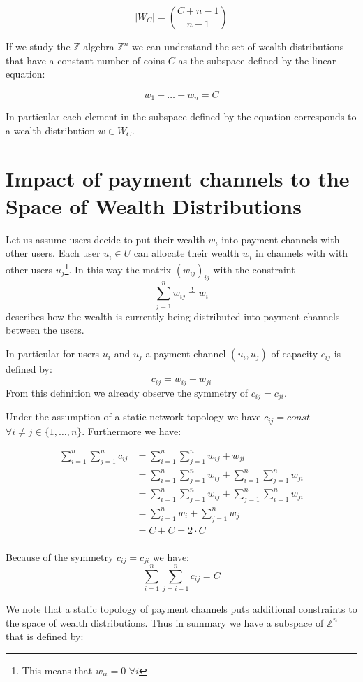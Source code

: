 \documentclass[10pt,twocolumn]{article}
\begin{document}
$$|W_C| = {{C + n - 1}\choose {n - 1}}$$ 

If we study the $\mathbb{Z}$-algebra $\mathbb{Z}^n$ we can understand the set of wealth distributions that have a constant number of coins $C$ as the subspace defined by the linear equation:

$$w_1 + \dots + w_n = C$$

In particular each element in the subspace defined by the equation corresponds to a wealth distribution $w \in W_C$.

\section{Impact of payment channels to the Space of Wealth Distributions}
Let us assume users decide to put their wealth $w_i$ into payment channels with other users.
Each user $u_i\in U$ can allocate their wealth $w_i$ in channels with with other users $u_j$\footnote{This means that $w_{ii}=0$ $\forall i$}.
In this way the matrix $(w_{ij})_{ij}$ with the constraint
$$\sum_{j=1}^nw_{ij}\stackrel{!}{=}w_i$$
describes how the wealth is currently being distributed into payment channels between the users.

In particular for users $u_i$ and $u_j$ a payment channel $(u_i,u_j)$ of capacity $c_{ij}$ is defined by:
$$c_{ij} = w_{ij} + w_{ji}$$
From this definition we already observe the symmetry of $c_{ij} = c_{ji}$.

Under the assumption of a static network topology we have $c_{ij} = const$ $\forall i\neq j \in \{1,\dots,n\}$.
Furthermore we have:

\begin{align*}
\sum_{i=1}^n\sum_{j=1}^nc_{ij} & = \sum_{i=1}^n\sum_{j=1}^nw_{ij} + w_{ji} \\
& = \sum_{i=1}^n\sum_{j=1}^nw_{ij} + \sum_{i=1}^n\sum_{j=1}^n w_{ji} \\
& = \sum_{i=1}^n\sum_{j=1}^nw_{ij} + \sum_{j=1}^n\sum_{i=1}^n w_{ji} \\
& = \sum_{i=1}^nw_i + \sum_{j=1}^nw_j \\
& = C + C = 2\cdot C \\
\end{align*}

Because of the symmetry $c_{ij} = c_{ji}$ we have:
$$\sum_{i=1}^n\sum_{j=i+1}^nc_{ij}  = C$$

We note that a static topology of payment channels puts additional constraints to the space of wealth distributions. Thus in summary we have a subspace of $\mathbb{Z}^n$ that is defined by:
\end{document}
